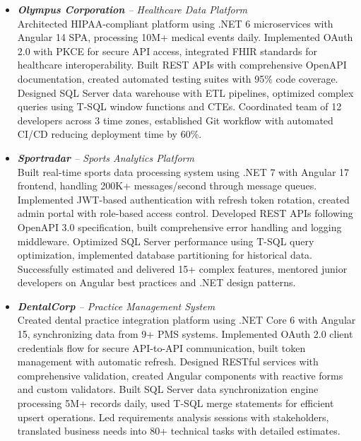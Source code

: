 \documentclass[11pt,a4paper,sans]{moderncv}
\begin{document}
{\begin{itemize}
\begin{itemize}
      \item \textit{\textbf{Olympus Corporation} – Healthcare Data Platform}\\
        Architected HIPAA-compliant platform using .NET 6 microservices with Angular 14 SPA, processing 10M+ medical
        events daily. Implemented OAuth 2.0 with PKCE for secure API access, integrated FHIR standards for healthcare
        interoperability. Built REST APIs with comprehensive OpenAPI documentation, created automated testing suites with
        95\% code coverage. Designed SQL Server data warehouse with ETL pipelines, optimized complex queries using T-SQL
        window functions and CTEs. Coordinated team of 12 developers across 3 time zones, established Git workflow with
        automated CI/CD reducing deployment time by 60\%.

      \item \textit{\textbf{Sportradar} – Sports Analytics Platform}\\
        Built real-time sports data processing system using .NET 7 with Angular 17 frontend, handling 200K+ messages/second
        through message queues. Implemented JWT-based authentication with refresh token rotation, created admin portal with
        role-based access control. Developed REST APIs following OpenAPI 3.0 specification, built comprehensive error
        handling and logging middleware. Optimized SQL Server performance using T-SQL query optimization, implemented
        database partitioning for historical data. Successfully estimated and delivered 15+ complex features, mentored
        junior developers on Angular best practices and .NET design patterns.

      \item \textit{\textbf{DentalCorp} – Practice Management System}\\
        Created dental practice integration platform using .NET Core 6 with Angular 15, synchronizing data from 9+ PMS
        systems. Implemented OAuth 2.0 client credentials flow for secure API-to-API communication, built token management
        with automatic refresh. Designed RESTful services with comprehensive validation, created Angular components with
        reactive forms and custom validators. Built SQL Server data synchronization engine processing 5M+ records daily,
        used T-SQL merge statements for efficient upsert operations. Led requirements analysis sessions with stakeholders,
        translated business needs into 80+ technical tasks with detailed estimates.
    \end{itemize}
\end{itemize}}
\end{document}
